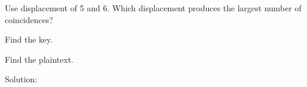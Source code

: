 \documentclass[12pt,letterpaper,final]{report}
\begin{document}
\bigskip
{}
\begin{alphalist}
	\item Use displacement of 5 and 6. Which displacement produces the largest number of coincidences?
	\item Find the key.
	\item Find the plaintext.
\end{alphalist}

\bigskip
\indent Solution: 
\end{document}
